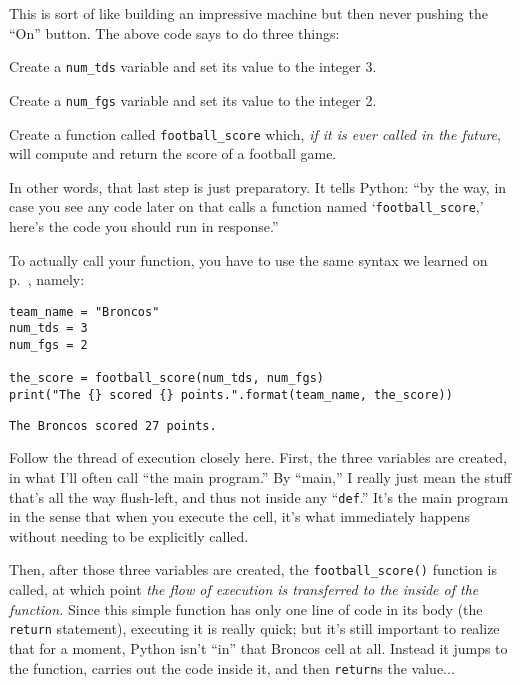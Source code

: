 This is sort of like building an impressive machine but then never pushing the
``On'' button. The above code says to do three things:

\begin{compactenum}
\item Create a \texttt{num\_tds} variable and set its value to the integer 3.
\item Create a \texttt{num\_fgs} variable and set its value to the integer 2.
\item Create a function called \texttt{football\_score} which, \textit{if it is
ever called in the future}, will compute and return the score of a football
game.
\end{compactenum}

In other words, that last step is just preparatory. It tells Python: ``by the
way, in case you see any code later on that calls a function named
`\texttt{football\_score},' here's the code you should run in response.''

To actually call your function, you have to use the same syntax we learned on
p.~\pageref{function}, namely:

\begin{Verbatim}[fontsize=\small,samepage=true,frame=single,framesep=3mm]
team_name = "Broncos"
num_tds = 3
num_fgs = 2

the_score = football_score(num_tds, num_fgs)
print("The {} scored {} points.".format(team_name, the_score))
\end{Verbatim}
\vspace{-.2in}

\begin{Verbatim}[fontsize=\small,samepage=true,frame=leftline,framesep=5mm,framerule=1mm]
The Broncos scored 27 points.
\end{Verbatim}


Follow the thread of execution closely here. First, the three variables are
created, in what I'll often call ``the main program.'' By ``main,'' I really
just mean the stuff that's all the way flush-left, and thus not inside any
``\texttt{def}.'' It's the main program in the sense that when you execute the
cell, it's what immediately happens without needing to be explicitly called.

Then, after those three variables are created, the \texttt{football\_score()}
function is called, at which point \textit{the flow of execution is transferred
to the inside of the function.} Since this simple function has only one line of
code in its body (the \texttt{return} statement), executing it is really quick;
but it's still important to realize that for a moment, Python isn't ``in'' that
Broncos cell at all. Instead it jumps to the function, carries out the code
inside it, and then \texttt{return}s the value...

